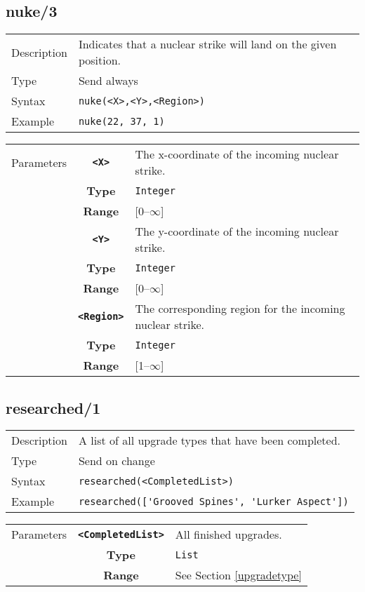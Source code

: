 \subsection{nuke/3}
\begin{tabularx}{\textwidth}{lX}
 Description & Indicates that a nuclear strike will land on the given position. \\
 Type & Send always \\
 Syntax & \verb|nuke(<X>,<Y>,<Region>)| \\
 Example & \verb|nuke(22, 37, 1)|   \\
 \end{tabularx}
 \begin{tabularx}{\textwidth}{l | c | p{8cm}|}
 \cline{2-3}
 Parameters & \textbf{\verb|<X>|} & The x-coordinate of the incoming nuclear strike.\\
            & \textbf{Type} & \verb|Integer| \\
            &\textbf{Range} &  [0--$\infty$] \\
            \cline{2-3}
            & \textbf{\verb|<Y>|} & The y-coordinate of the incoming nuclear strike.\\
            & \textbf{Type} & \verb|Integer| \\
            &\textbf{Range} & [0--$\infty$] \\
            \cline{2-3}
            & \textbf{\verb|<Region>|} & The corresponding region for the incoming nuclear strike.\\
            & \textbf{Type} & \verb|Integer| \\
            &\textbf{Range} & [1--$\infty$] \\
            \cline{2-3}
\end{tabularx}



\subsection{researched/1}
\begin{tabularx}{\textwidth}{lX}
 Description & A list of all upgrade types that have been completed. \\
 Type & Send on change \\
 Syntax & \verb|researched(<CompletedList>)| \\
 Example & \verb|researched(['Grooved Spines', 'Lurker Aspect'])| \\
 \end{tabularx}
 \begin{tabularx}{\textwidth}{l | c | p{8cm}|}
 \cline{2-3}
 Parameters & \textbf{\verb|<CompletedList>|} & All finished upgrades. \\
            & \textbf{Type} & \verb|List| \\
            & \textbf{Range} & See Section \ref{upgradetype} \\
            \cline{2-3}
\end{tabularx}

